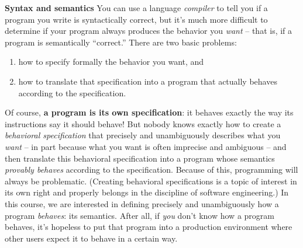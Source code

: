 \begin{minipage}[t]{\sw}
\slidenumber
\LARGE
{\bf Syntax and semantics}\exx
You can use a language {\em compiler} to tell you
if a program you write is syntactically correct,
but it's much more difficult to determine
if your program always produces the behavior you {\em want} --
that is, if a program is semantically ``correct.''
There are two basic problems:\\[-1.5em]
\begin{enumerate}
\itemsep -0.3em
\item how to specify formally the behavior you want, and
\item how to translate that specification into a program
      that actually behaves according to the specification.
\end{enumerate}
Of course, {\bf a program is its own specification}:
it behaves exactly the way its instructions say it should behave!
But nobody knows exactly how to create a
{\em behavioral specification}
that precisely and unambiguously describes
what you {\em want} --
in part because what you want is often imprecise and ambiguous --
and then translate this behavioral specification
into a program whose semantics {\em provably behaves}
according to the specification.
Because of this, programming will always be problematic.
(Creating behavioral specifications is a topic
of interest in its own right and properly belongs
in the discipline of software engineering.)\exx
In this course, we are interested in defining precisely and unambiguously
how a program {\em behaves}: its semantics.
After all, if {\em you} don't know how a program behaves,
it's hopeless to put that program into a production environment
where other users expect it to behave in a certain way.
\end{minipage}
\clearpage
